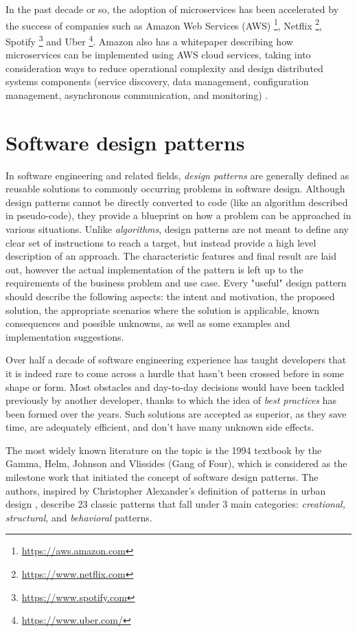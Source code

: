 In the past decade or so, the adoption of microservices has been accelerated by the success of companies such as Amazon Web Services (AWS) \footnote{\url{https://aws.amazon.com}}, Netflix \footnote{\url{https://www.netflix.com}}, Spotify \footnote{\url{https://www.spotify.com}} and Uber \footnote{\url{https://www.uber.com/}}. Amazon also has a whitepaper describing how microservices can be implemented using AWS cloud services, taking into consideration ways to reduce operational complexity and design distributed systems components (service discovery, data management, configuration management, asynchronous communication, and monitoring) \cite{aws-microservices}.

\section{Software design patterns}

In software engineering and related fields, \textit{design patterns} are generally defined as reusable solutions to commonly occurring problems in software design. Although design patterns cannot be directly converted to code (like an algorithm described in pseudo-code), they provide a blueprint on how a problem can be approached in various situations. Unlike \textit{algorithms}, design patterns are not meant to define any clear set of instructions to reach a target, but instead provide a high level description of an approach. The characteristic features and final result are laid out, however the actual implementation of the pattern is left up to the requirements of the business problem and use case. Every "useful" design pattern should describe the following aspects: the intent and motivation, the proposed solution, the appropriate scenarios where the solution is applicable, known consequences and possible unknowns, as well as some examples and implementation suggestions.

Over half a decade of software engineering experience has taught developers that it is indeed rare to come across a hurdle that hasn't been crossed before in some shape or form. Most obstacles and day-to-day decisions would have been tackled previously by another developer, thanks to which the idea of \textit{best practices} has been formed over the years. Such solutions are accepted as superior, as they save time, are adequately efficient, and don't have many unknown side effects.

The most widely known literature on the topic is the 1994 textbook \cite{gof94} by the Gamma, Helm, Johnson and Vlissides (Gang of Four), which is considered as the milestone work that initiated the concept of software design patterns. The authors, inspired by Christopher Alexander's definition of patterns in urban design \cite{alexander77}, describe 23 classic patterns that fall under 3 main categories: \textit{creational, structural}, and \textit{behavioral} patterns.

